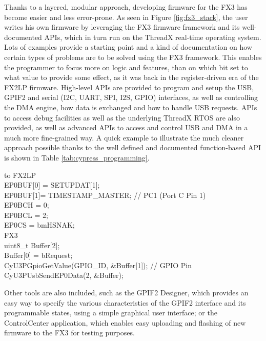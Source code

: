 \documentclass[a4paper,12pt]{report}
\begin{document}
Thanks to a layered, modular approach, developing firmware for the FX3 has become easier and less error-prone. As seen in Figure \ref{fig:fx3_stack}, the user writes his own firmware by leveraging the FX3 firmware framework and its well-documented APIs, which in turn run on the ThreadX real-time operating system. Lots of examples provide a starting point and a kind of documentation on how certain types of problems are to be solved using the FX3 framework. This enables the programmer to focus more on logic and features, than on which bit set to what value to provide some effect, as it was back in the register-driven era of the FX2LP firmware.
High-level APIs are provided to program and setup the USB, GPIF2 and serial (I2C, UART, SPI, I2S, GPIO) interfaces, as well as controlling the DMA engine, how data is exchanged and how to handle USB requests. APIs to access debug facilities as well as the underlying ThreadX RTOS are also provided, as well as advanced APIs to access and control USB and DMA in a much more fine-grained way.
A quick example to illustrate the much cleaner approach possible thanks to the well defined and documented function-based API is shown in Table \ref{tab:cypress_programming}.

\begin{table}[H]
\begin{center}
\caption{Cypress FX3 function-based API versus FX2LP register-driven API}
\label{tab:cypress_programming}
\begin{tabu} to \linewidth {|l|}
\hline
FX2LP \\ \hline
EP0BUF[0] = SETUPDAT[1]; \\
EP0BUF[1]= TIMESTAMP\_MASTER; // PC1 (Port C Pin 1) \\
EP0BCH = 0; \\
EP0BCL = 2; \\
EP0CS \textbar= bmHSNAK; \\ \hline
FX3 \\ \hline
uint8\_t Buffer[2]; \\
Buffer[0] = bRequest; \\
CyU3PGpioGetValue(GPIO\_ID, \&Buffer[1]); // GPIO Pin \\
CyU3PUsbSendEP0Data(2, \&Buffer); \\ \hline
\end{tabu}
\end{center}
\end{table}

Other tools are also included, such as the GPIF2 Designer, which provides an easy way to specify the various characteristics of the GPIF2 interface and its programmable states, using a simple graphical user interface; or the ControlCenter application, which enables easy uploading and flashing of new firmware to the FX3 for testing purposes.
\end{document}
